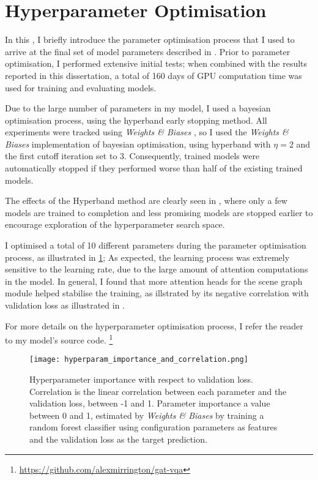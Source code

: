 \section{Hyperparameter Optimisation}
\label{sec:hyperparameter_optimisation}

In this \sectionautorefname, I briefly introduce the parameter optimisation process that I used to arrive at the final set of model parameters described in \subsectionautorefname{ \ref{sec:implementation_details}}. Prior to parameter optimisation, I performed extensive initial tests; when combined with the results reported in this dissertation, a total of 160 days of GPU computation time was used for training and evaluating models.

Due to the large number of parameters in my model, I used a bayesian optimisation process, using the hyperband \cite{li2017hyperband} early stopping method. All experiments were tracked using \textit{Weights \& Biases} \cite{wandb}, so I used the \textit{Weights \& Biases} implementation of bayesian optimisation, using hyperband with \(\eta = 2\) and the first cutoff iteration set to 3. Consequently, trained models were automatically stopped if they performed worse than half of the existing trained models. 

The effects of the Hyperband method are clearly seen in \figureautorefname{ \ref{fig:hyperparameter_optimisation_validation_loss_and_accuracy}}, where only a few models are trained to completion and less promising models are stopped earlier to encourage exploration of the hyperparameter search space.

I optimised a total of 10 different parameters during the parameter optimisation process, as illustrated in \ref{fig:hyperparam_importance_and_correlation}; As expected, the learning process was extremely sensitive to the learning rate, due to the large amount of attention computations in the model. In general, I found that more attention heads for the scene graph module helped stabilise the training, as illstrated by its negative correlation with validation loss as illustrated in \figureautorefname{ \ref{fig:hyperparam_importance_and_correlation}}.

For more details on the hyperparameter optimisation process, I refer the reader to my model's source code. \footnote{\url{https://github.com/alexmirrington/gat-vqa}}
\begin{figure}
    \centering
    \texttt{[image: hyperparam\_importance\_and\_correlation.png]}
    \caption[Esimated parameter importance and correlation]{Hyperparameter importance with respect to validation loss. Correlation is the linear correlation between each parameter and the validation loss, between -1 and 1. Parameter importance a value between 0 and 1, estimated by \textit{Weights \& Biases} \cite{wandb} by training a random forest classifier using configuration parameters as features and the validation loss as the target prediction.}
    \label{fig:hyperparam_importance_and_correlation}
\end{figure}


